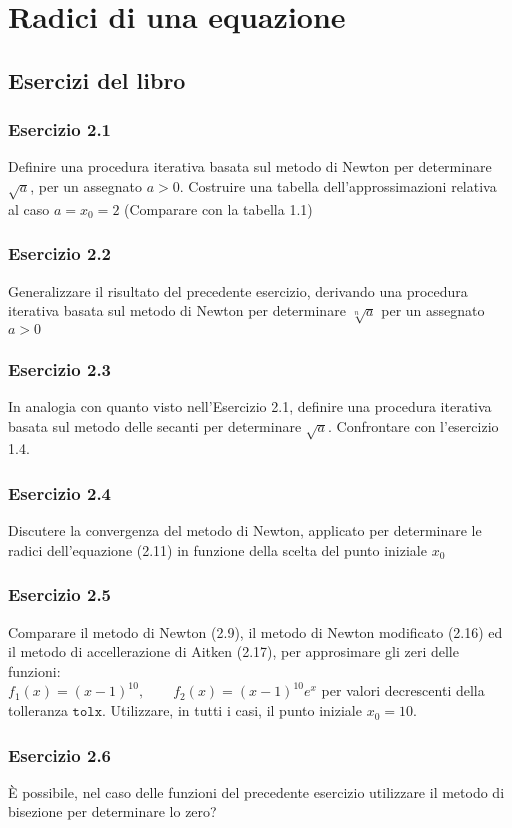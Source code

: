 \chapter{Radici di una equazione}
\section{Esercizi del libro}
\subsection{Esercizio 2.1}
Definire una procedura iterativa basata sul metodo di Newton per determinare $\sqrt{a}$, per un assegnato $a>0$. Costruire una tabella dell'approssimazioni relativa al caso $a=x_{0}=2$ (Comparare con la tabella 1.1)
\subsection{Esercizio 2.2}
Generalizzare il risultato del precedente esercizio, derivando una procedura iterativa basata sul metodo di Newton per determinare $\sqrt[n]{a}$ per un assegnato $a>0$
\subsection{Esercizio 2.3}
In analogia con quanto visto nell'Esercizio 2.1, definire una procedura iterativa basata sul metodo delle secanti per determinare $\sqrt{a}$. Confrontare con l'esercizio 1.4.
\subsection{Esercizio 2.4}
Discutere la convergenza del metodo di Newton, applicato per determinare le radici dell'equazione (2.11) in funzione della scelta del punto iniziale $x_{0}$
\subsection{Esercizio 2.5}
Comparare il metodo di Newton (2.9), il metodo di Newton modificato (2.16) ed il metodo di accellerazione di Aitken (2.17), per approsimare gli zeri delle funzioni:\\
\center $f_{1}(x) = (x-1)^{10}, \qquad f_{2}(x)=(x-1)^{10}e^{x} $
\flushleft per valori decrescenti della tolleranza $\mathtt{tolx}$. Utilizzare, in tutti i casi, il punto iniziale $x_{0}=10$.
\subsection{Esercizio 2.6}
È possibile, nel caso delle funzioni del precedente esercizio utilizzare il metodo di bisezione per determinare lo zero?
